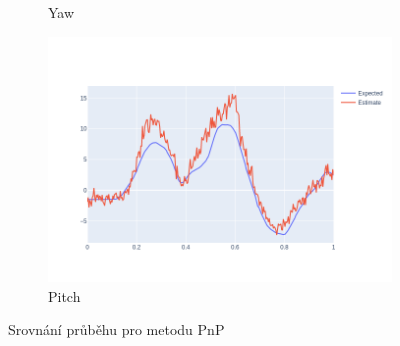 \documentclass[12pt,a4paper,titlepage,final]{report}
\begin{document}
\begin{figure}[!h]
\begin{subfigure}[b]{0.32\textwidth}
   \caption{Yaw}
    \label{fig:pnp_yaw}
  \end{subfigure}
  \hfill
    \begin{subfigure}[b]{0.32\textwidth}
    \includegraphics[width=\textwidth]{images/evaluation/3D_model_pitch_user_01_video_07.png}
   \caption{Pitch}
    \label{fig:pnp_pitch}
  \end{subfigure}
  \caption{Srovnání průběhu pro metodu PnP}
  \label{fig:pnp_graphs}
\end{figure}
\end{document}
